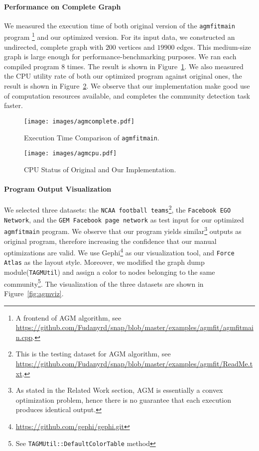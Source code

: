 \paragraph{Performance on Complete Graph} We measured the execution time of 
both original version of the \texttt{agmfitmain} program
\footnote{A frontend of AGM algorithm, see \url{https://github.com/Fudanyrd/snap/blob/master/examples/agmfit/agmfitmain.cpp}.}
 and our optimized version. For its input data, we constructed an undirected,
complete graph with $200$ vertices and $19900$ edges. This medium-size graph 
is large enough  for performance-benchmarking purposes.
We ran each compiled program $8$ times.
The result is shown in Figure~\ref{fig:agmcomplete}. We also measured the CPU utility 
rate of both our optimized program  against original ones, the result is 
shown in Figure~\ref{fig:agmcpu}. We observe that our implementation make
good use of computation resources available, and completes the 
community detection task faster.

\begin{figure*}[ht]
    \centering
    \begin{subfigure}[b]{0.45\textwidth}
        \texttt{[image: images/agmcomplete.pdf]}
        \caption{Execution Time Comparison of \texttt{agmfitmain}. }
        \label{fig:agmcomplete}
    \end{subfigure}
    \begin{subfigure}[b]{0.45\textwidth}
        \texttt{[image: images/agmcpu.pdf]}
        \caption{CPU Status of Original and Our Implementation.}
        \label{fig:agmcpu}
    \end{subfigure}
    \caption{Performance Evaluation}
\end{figure*}

\paragraph{Program Output Visualization} We selected three datasets:
the \texttt{NCAA football teams}\footnote{This is the testing dataset 
for AGM algorithm, see \url{https://github.com/Fudanyrd/snap/blob/master/examples/agmfit/ReadMe.txt}. }, 
the \texttt{Facebook EGO Network}\citep{egonetwork}, 
and the \texttt{GEM Facebook page network}\citep{gemsec} as test input
for our optimized \texttt{agmfitmain} program. We observe that our program
yields similar\footnote{As stated in the Related Work section, AGM
is essentially a convex optimization problem, hence there is no guarantee
that each execution produces identical output. }
outputs as original program, therefore increasing 
the confidence that our manual optimizations are valid. 
We use Gephi\footnote{\url{https://github.com/gephi/gephi.git}} as 
our visualization tool, and \texttt{Force Atlas} as the layout style. Moreover,
we modified the graph dump module(\texttt{TAGMUtil}) and assign a color
to nodes belonging to the same community\footnote{See \texttt{TAGMUtil::DefaultColorTable}
method}.
The visualization of the three datasets are shown in Figure~\ref{fig:agmviz}. 


